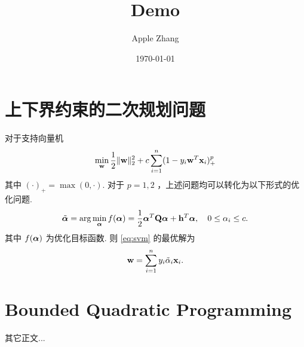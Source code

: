 \documentclass{article}
\title{Demo}
\author{Apple Zhang}
\date{\today}
\begin{document}
\maketitle


\section{上下界约束的二次规划问题}
对于支持向量机
\begin{align}
    \min_{{\mathbf w}}\frac12\|{\mathbf w}\|_2^2+c\sum_{i=1}^n(1-y_i{\mathbf w}^T{\mathbf x}_i)^{p}_+\label{eq:svm}
\end{align}
其中 $(\cdot)_+=\max(0,\cdot)$.
对于 $p=1,2$ ，上述问题均可以转化为以下形式的优化问题.
\begin{align}
    \tilde{{\bm\alpha}}=\arg\min_{{\bm\alpha}}f({\bm\alpha})=\frac12{\bm\alpha}^T{\mathbf Q}{\bm\alpha}+{\mathbf h}^T{\bm\alpha},\quad 0\leq\alpha_i\leq c.\label{eq:boxqp}
\end{align}
其中 $f({\bm\alpha})$ 为优化目标函数.
则 \eqref{eq:svm} 的最优解为
\begin{equation}
    {\mathbf w}=\sum_{i=1}^ny_i\tilde\alpha_i{\mathbf x}_i.
\end{equation}


\section{Bounded Quadratic Programming}
其它正文...




\end{document}

